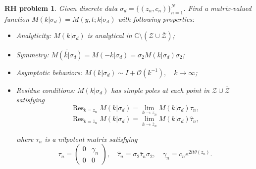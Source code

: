 \documentclass[11pt]{article}
\numberwithin{equation}{section}
\newtheorem{RHP}{RH problem}
\DeclareMathOperator*{\res}{Res}
\begin{document}
\begin{RHP}\label{rhp7}
    Given discrete data $\sigma_d = \{(z_n, c_n)\}_{n=1}^N$. Find a matrix-valued function
$M(k|\sigma_d) = M( y, t;k|\sigma_d)$
with following properties:

\begin{itemize}
    \item Analyticity: $M(k|\sigma_d)$ is analytical in $\mathbb{C} \setminus (\mathcal{Z} \cup \overline{\mathcal{Z}})$;
    \item Symmetry: $\overline{M(\overline{k}|\sigma_d) }= M(-k|\sigma_d) = \sigma_2 M(k|\sigma_d) \sigma_2$;
    \item Asymptotic behaviors:
    $ M(k|\sigma_d) \sim I + \mathcal{O}(k^{-1}), \quad k \to \infty$;
    \item Residue conditions: $M(k|\sigma_d)$ has simple poles at each point in $\mathcal{Z} \cup \overline{\mathcal{Z}}$ satisfying
    \begin{equation*}
        \res_{k=z_n} M(k|\sigma_d) = \lim_{k \to z_n} M(k|\sigma_d) \tau_n,
    \end{equation*}
    \begin{equation*}
         \res_{k=\overline{z}_n} M(k|\sigma_d) = \lim_{k \to \overline{z}_n} M(k|\sigma_d) \widehat{\tau}_n,
    \end{equation*}

    where $\tau_n$ is a nilpotent matrix satisfying
    \begin{equation}
        \tau_n =
    \begin{pmatrix}
    0 & \gamma_n \\
    0 & 0
    \end{pmatrix},
    \quad \widehat{\tau}_n = \sigma_2 \overline{\tau}_n \sigma_2, \quad \gamma_n = c_n e^{2it\theta(z_n)}.
    \end{equation}

\end{itemize}

\end{RHP}
\end{document}
